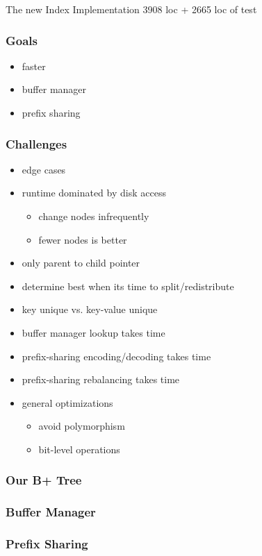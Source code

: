 \documentclass{beamer}
\begin{document}
  \begin{section}{The new Index Implementation}
    3908 loc + 2665 loc of test
    \begin{frame}
      \frametitle{Goals}
        \begin{itemize}
          \item faster
          \item buffer manager
          \item prefix sharing
        \end{itemize}
    \end{frame}
    \begin{frame}
      \frametitle{Challenges}
        \begin{itemize}
          \item edge cases
          \item runtime dominated by disk access
          \begin{itemize}
            \item change nodes infrequently
            \item fewer nodes is better
          \end{itemize}
          \item only parent to child pointer
          \item determine best when its time to split/redistribute
          \item key unique vs. key-value unique
          \item buffer manager lookup takes time 
          \item prefix-sharing encoding/decoding takes time
          \item prefix-sharing rebalancing takes time
          \item general optimizations
            \begin{itemize}
              \item avoid polymorphism
              \item bit-level operations
            \end{itemize}
        \end{itemize}
    \end{frame}
    \begin{frame}
      \frametitle{Our B+ Tree}
    \end{frame}
    \begin{frame}
      \frametitle{Buffer Manager}
    \end{frame}
    \begin{frame}
      \frametitle{Prefix Sharing}
    \end{frame}
  \end{section}
\end{document}
